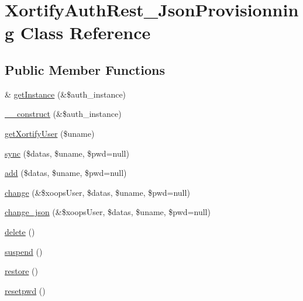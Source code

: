 \hypertarget{class_xortify_auth_rest___json_provisionning}{\section{Xortify\-Auth\-Rest\-\_\-\-Json\-Provisionning Class Reference}
\label{class_xortify_auth_rest___json_provisionning}
}
\subsection*{Public Member Functions}
\begin{DoxyCompactItemize}
\item 
\& \hyperlink{class_xortify_auth_rest___json_provisionning_a2c8eaa915c70d75289ac8a03686194f9}{get\-Instance} (\&\$auth\-\_\-instance)
\item 
\hyperlink{class_xortify_auth_rest___json_provisionning_a0f25832dc86774e7605b81fe57b083c2}{\-\_\-\-\_\-construct} (\&\$auth\-\_\-instance)
\item 
\hyperlink{class_xortify_auth_rest___json_provisionning_a041d726ac26672547ed1504e8e0117aa}{get\-Xortify\-User} (\$uname)
\item 
\hyperlink{class_xortify_auth_rest___json_provisionning_a35dc08b0f2138eb818ff95345b73bcff}{sync} (\$datas, \$uname, \$pwd=null)
\item 
\hyperlink{class_xortify_auth_rest___json_provisionning_adfc9fcef01e7bd7b2f47e8e79d51fc63}{add} (\$datas, \$uname, \$pwd=null)
\item 
\hyperlink{class_xortify_auth_rest___json_provisionning_ae1f0971b9712c794620cf309164e43af}{change} (\&\$xoops\-User, \$datas, \$uname, \$pwd=null)
\item 
\hyperlink{class_xortify_auth_rest___json_provisionning_a94f4e0408f26e65abca347ec883f4ec9}{change\-\_\-json} (\&\$xoops\-User, \$datas, \$uname, \$pwd=null)
\item 
\hyperlink{class_xortify_auth_rest___json_provisionning_a13bdffdd926f26b825ea57066334ff01}{delete} ()
\item 
\hyperlink{class_xortify_auth_rest___json_provisionning_ad73006a505121228f3b075c2409787d2}{suspend} ()
\item 
\hyperlink{class_xortify_auth_rest___json_provisionning_aa1371f22826cf8cde4454c9b467203d0}{restore} ()
\item 
\hyperlink{class_xortify_auth_rest___json_provisionning_a06d70fbd3a2db390b6f2530c0076628e}{resetpwd} ()
\end{DoxyCompactItemize}
